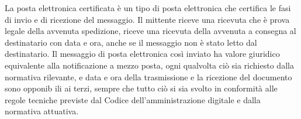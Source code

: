 La posta elettronica certificata è un tipo di posta elettronica che certifica le fasi di invio e di ricezione del messaggio. Il mittente riceve una ricevuta che è prova legale della avvenuta spedizione, riceve una ricevuta della avvenuta a consegna al destinatario con data e ora, anche se il messaggio non è stato letto dal destinatario. Il messaggio di posta elettronica così inviato ha valore giuridico equivalente alla notificazione a mezzo posta, ogni qualvolta ciò sia richiesto dalla normativa rilevante, e data e ora della trasmissione e la ricezione del documento sono opponib ili  ai terzi, sempre che tutto ciò si sia svolto in conformità alle regole tecniche previste dal Codice dell'amministrazione digitale e dalla normativa attuativa.